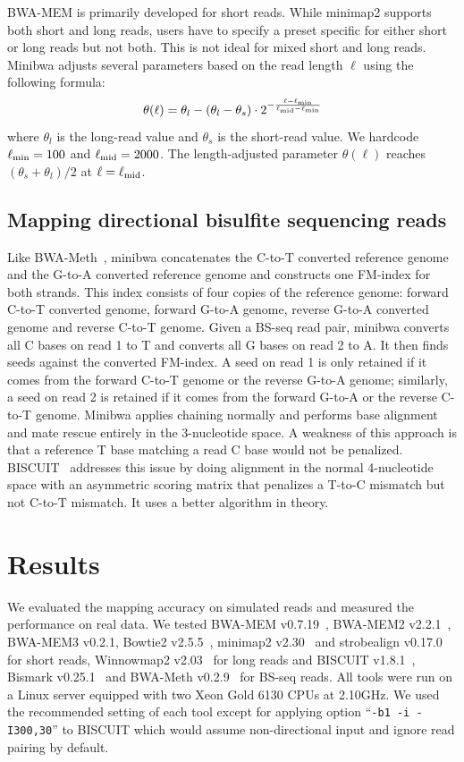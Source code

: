 \documentclass[webpdf,contemporary,large,namedate]{oup-authoring-template}%
\begin{document}
BWA-MEM is primarily developed for short reads.
While minimap2 supports both short and long reads,
users have to specify a preset specific for either short or long reads but not both.
This is not ideal for mixed short and long reads.
Minibwa adjusts several parameters based on the read length $\ell$ using the following formula:
$$
\theta(\ell)=\theta_l-(\theta_l-\theta_s)\cdot 2^{-\frac{\ell-\ell_{\rm min}}{\ell_{\rm mid}-\ell_{\rm min}}}
$$
where $\theta_l$ is the long-read value and $\theta_s$ is the short-read value.
We hardcode $\ell_{\rm min}=100$ and $\ell_{\rm mid}=2000$.
The length-adjusted parameter $\theta(\ell)$ reaches $(\theta_s+\theta_l)/2$ at $\ell=\ell_{\rm mid}$.

\subsection{Mapping directional bisulfite sequencing reads}\label{sec:meth}

Like BWA-Meth~\citep{Pedersen:2014aa}, minibwa concatenates the C-to-T converted reference genome
and the G-to-A converted reference genome and constructs one FM-index for both strands.
This index consists of four copies of the reference genome:
forward C-to-T converted genome, forward G-to-A genome,
reverse G-to-A converted genome and reverse C-to-T genome.
Given a BS-seq read pair, minibwa converts all C bases on read 1 to T
and converts all G bases on read 2 to A.
It then finds seeds against the converted FM-index.
A seed on read 1 is only retained if it comes from the forward C-to-T genome or the reverse G-to-A genome;
similarly, a seed on read 2 is retained if it comes from the forward G-to-A or the reverse C-to-T genome.
Minibwa applies chaining normally and performs base alignment and mate rescue entirely in the 3-nucleotide space.
A weakness of this approach is that a reference T base matching a read C base would not be penalized.
BISCUIT~\citep{Zhou:2024ac} addresses this issue by doing alignment in the normal 4-nucleotide space
with an asymmetric scoring matrix that penalizes a T-to-C mismatch but not C-to-T mismatch.
It uses a better algorithm in theory.

\section{Results}

We evaluated the mapping accuracy on simulated reads and
measured the performance on real data.
We tested BWA-MEM v0.7.19~\citep{Li:2013aa}, BWA-MEM2 v2.2.1~\citep{DBLP:conf/ipps/VasimuddinMLA19},
BWA-MEM3 v0.2.1, Bowtie2 v2.5.5~\citep{Langmead:2012fk}, minimap2 v2.30~\citep{Li:2018ab} and strobealign v0.17.0~\citep{Sahlin:2022aa} for short reads,
Winnowmap2 v2.03~\citep{Jain:2020aa,Jain:2022ua} for long reads
and BISCUIT v1.8.1~\citep{Zhou:2024ac}, Bismark v0.25.1~\citep{Krueger:2011aa}
and BWA-Meth v0.2.9~\citep{Pedersen:2014aa} for BS-seq reads.
All tools were run on a Linux server equipped with two Xeon Gold 6130 CPUs at 2.10GHz.
We used the recommended setting of each tool except for applying option ``{\tt -b1 -i -I300,30}'' to BISCUIT
which would assume non-directional input and ignore read pairing by default.
\end{document}
